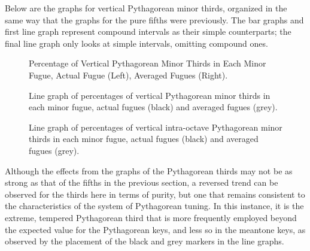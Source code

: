 Below are the graphs for vertical Pythagorean minor thirds, organized in
the same way that the graphs for the pure fifths were previously. The
bar graphs and first line graph represent compound intervals as their
simple counterparts; the final line graph only looks at simple
intervals, omitting compound ones.



\begin{figure}[H]
    \begin{center}
    \caption[Percentage of Vertical Pythagorean Minor Thirds in Each Minor Fugue. ]{Percentage of Vertical Pythagorean Minor Thirds in Each Minor Fugue, Actual Fugue (Left), Averaged Fugues (Right).}
    \end{center}
\end{figure}
    



\begin{figure}[H]
    \begin{center}
    \caption[Line graph of percentages of vertical Pythagorean minor thirds in each minor fugue, actual fugues vs. averaged fugues. ]{Line graph of percentages of vertical Pythagorean minor thirds in each minor fugue, actual fugues (black) and averaged fugues (grey).}
    \end{center}
\end{figure}
    



\begin{figure}[H]
    \begin{center}
    \caption[Line graph of percentages of vertical intra-octave Pythagorean minor thirds in each minor fugue, actual fugues vs. averaged fugues. ]{Line graph of percentages of vertical intra-octave Pythagorean minor thirds in each minor fugue, actual fugues (black) and averaged fugues (grey).}
    \end{center}
\end{figure}
    
    Although the effects from the graphs of the Pythagorean thirds may not
be as strong as that of the fifths in the previous section, a reversed
trend can be observed for the thirds here in terms of purity, but one
that remains consistent to the characteristics of the system of
Pythagorean tuning. In this instance, it is the extreme, tempered
Pythagorean third that is more frequently employed beyond the expected
value for the Pythagorean keys, and less so in the meantone keys, as
observed by the placement of the black and grey markers in the line
graphs.

